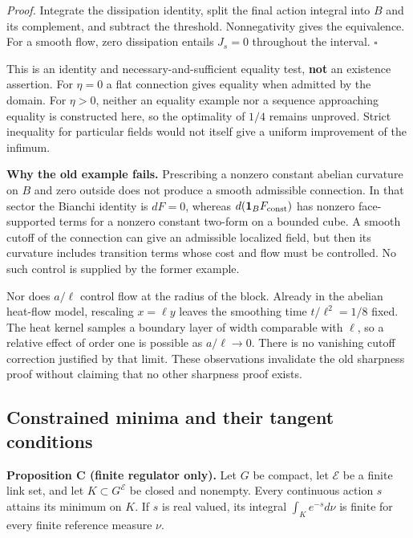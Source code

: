 \documentclass[11pt,a4paper]{article}
\begin{document}
\emph{Proof.} Integrate the dissipation identity, split the final action
integral into \(B\) and its complement, and subtract the threshold.
Nonnegativity gives the equivalence. For a smooth flow, zero dissipation
entails \(J_s=0\) throughout the interval. \(\square\)

This is an identity and necessary-and-sufficient equality test,
\textbf{not} an existence assertion. For \(\eta=0\) a flat connection
gives equality when admitted by the domain. For \(\eta>0\), neither an
equality example nor a sequence approaching equality is constructed
here, so the optimality of \(1/4\) remains unproved. Strict inequality
for particular fields would not itself give a uniform improvement of the
infimum.

\textbf{Why the old example fails.} Prescribing a nonzero constant
abelian curvature on \(B\) and zero outside does not produce a smooth
admissible connection. In that sector the Bianchi identity is \(dF=0\),
whereas \(d(\mathbf1_B F_{\rm const})\) has nonzero face-supported terms
for a nonzero constant two-form on a bounded cube. A smooth cutoff of
the connection can give an admissible localized field, but then its
curvature includes transition terms whose cost and flow must be
controlled. No such control is supplied by the former example.

Nor does \(a/\ell\) control flow at the radius of the block. Already in
the abelian heat-flow model, rescaling \(x=\ell y\) leaves the smoothing
time \(t/\ell^2=1/8\) fixed. The heat kernel samples a boundary layer of
width comparable with \(\ell\), so a relative effect of order one is
possible as \(a/\ell\to0\). There is no vanishing cutoff correction
justified by that limit. These observations invalidate the old sharpness
proof without claiming that no other sharpness proof exists.

\hypertarget{constrained-minima-and-their-tangent-conditions}{%
\subsection{Constrained minima and their tangent
conditions}\label{constrained-minima-and-their-tangent-conditions}}

\textbf{Proposition C (finite regulator only).} Let \(G\) be compact,
let \(\mathcal E\) be a finite link set, and let
\(K\subset G^{\mathcal E}\) be closed and nonempty. Every continuous
action \(s\) attains its minimum on \(K\). If \(s\) is real valued, its
integral \(\int_K e^{-s}d\nu\) is finite for every finite reference
measure \(\nu\).
\end{document}
